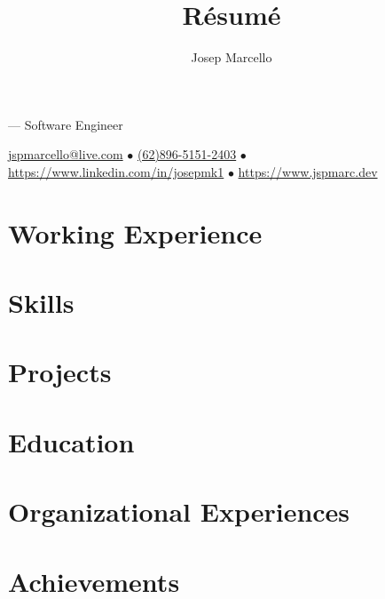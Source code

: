 \documentclass[10pt]{article}
\makeatletter
\renewcommand{\maketitle}{
    \rmfamily
    {\huge \theauthor} ---
    \sffamily
    Software Engineer

    \vspace{0.5ex}
    \href{mailto:jspmarcello@live.com}{jspmarcello@live.com} $\bullet$
    \href{https://wa.me/6289651512403}{(62)896-5151-2403} $\bullet$
    \href{https://www.linkedin.com/in/josepmk1}{https://www.linkedin.com/in/josepmk1} $\bullet$
    \href{https://www.jspmarc.dev}{https://www.jspmarc.dev}
    \vspace{-2ex}
}
\makeatother
\begin{document}
\title{R\'esum\'e}
\author{Josep Marcello}

\maketitle

\section{Working Experience}

\section{Skills}

\section{Projects}

\section{Education}

\section{Organizational Experiences}

\section{Achievements}
\end{document}
